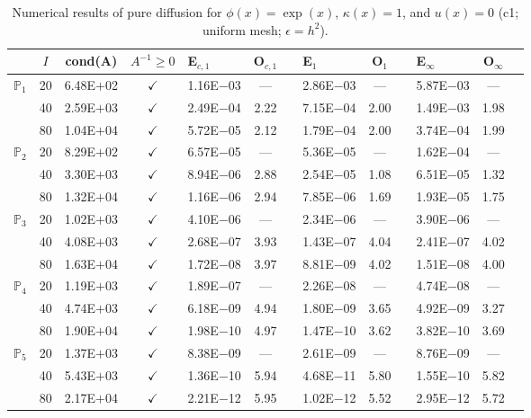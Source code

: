 \begin{table}[H]
\centering
\caption{Numerical results of pure diffusion for $\phi(x)=\exp(x)$, $\kappa(x)=1$, and $u(x)=0$ (c1; uniform mesh; $\epsilon=h^2$).}
\begin{tabular}{@{}l c c c l c c l c c l c c@{}}
\toprule
 & $I$ & cond(A) & $A^{-1}\geq 0$ &  E$_{c,1}$ & O$_{c,1}$ && E$_1$ & O$_1$ && E$_{\infty}$ & O$_{\infty}$\\
\midrule
\multirow{3}{*}{$\mathbb{P}_{1}$}
 & 20 & 6.48E$+$02 & $\checkmark$ & 1.16E$-$03 & --- && 2.86E$-$03 & --- && 5.87E$-$03 & ---\\
 & 40 & 2.59E$+$03 & $\checkmark$ & 2.49E$-$04 & 2.22 && 7.15E$-$04 & 2.00 && 1.49E$-$03 & 1.98\\
 & 80 & 1.04E$+$04 & $\checkmark$ & 5.72E$-$05 & 2.12 && 1.79E$-$04 & 2.00 && 3.74E$-$04 & 1.99\\
\midrule
\multirow{3}{*}{$\mathbb{P}_{2}$}
 & 20 & 8.29E$+$02 & $\checkmark$ & 6.57E$-$05 & --- && 5.36E$-$05 & --- && 1.62E$-$04 & ---\\
 & 40 & 3.30E$+$03 & $\checkmark$ & 8.94E$-$06 & 2.88 && 2.54E$-$05 & 1.08 && 6.51E$-$05 & 1.32\\
 & 80 & 1.32E$+$04 & $\checkmark$ & 1.16E$-$06 & 2.94 && 7.85E$-$06 & 1.69 && 1.93E$-$05 & 1.75\\
\midrule
\multirow{3}{*}{$\mathbb{P}_{3}$}
 & 20 & 1.02E$+$03 & $\checkmark$ & 4.10E$-$06 & --- && 2.34E$-$06 & --- && 3.90E$-$06 & ---\\
 & 40 & 4.08E$+$03 & $\checkmark$ & 2.68E$-$07 & 3.93 && 1.43E$-$07 & 4.04 && 2.41E$-$07 & 4.02\\
 & 80 & 1.63E$+$04 & $\checkmark$ & 1.72E$-$08 & 3.97 && 8.81E$-$09 & 4.02 && 1.51E$-$08 & 4.00\\
\midrule
\multirow{3}{*}{$\mathbb{P}_{4}$}
 & 20 & 1.19E$+$03 & $\checkmark$ & 1.89E$-$07 & --- && 2.26E$-$08 & --- && 4.74E$-$08 & ---\\
 & 40 & 4.74E$+$03 & $\checkmark$ & 6.18E$-$09 & 4.94 && 1.80E$-$09 & 3.65 && 4.92E$-$09 & 3.27\\
 & 80 & 1.90E$+$04 & $\checkmark$ & 1.98E$-$10 & 4.97 && 1.47E$-$10 & 3.62 && 3.82E$-$10 & 3.69\\
\midrule
\multirow{3}{*}{$\mathbb{P}_{5}$}
 & 20 & 1.37E$+$03 & $\checkmark$ & 8.38E$-$09 & --- && 2.61E$-$09 & --- && 8.76E$-$09 & ---\\
 & 40 & 5.43E$+$03 & $\checkmark$ & 1.36E$-$10 & 5.94 && 4.68E$-$11 & 5.80 && 1.55E$-$10 & 5.82\\
 & 80 & 2.17E$+$04 & $\checkmark$ & 2.21E$-$12 & 5.95 && 1.02E$-$12 & 5.52 && 2.95E$-$12 & 5.72\\
\bottomrule
\end{tabular}
\end{table}